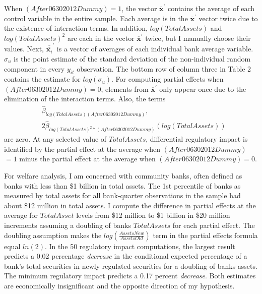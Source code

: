 \documentclass[preprint,12pt]{elsarticle}
\begin{document}
When $(After06302012Dummy)=1$, the vector $\overline{\bm{x}}^{'}$ contains the average of each control variable in the entire sample.  Each average is in the $\overline{\bm{x}}^{'}$ vector twice due to the existence of interaction terms.  In addition, $log(TotalAssets)$ and $log(TotalAssets)^{2}$ are each in the vector $\overline{\bm{x}}^{'}$ twice, but I manually choose their values.  Next, $\overline{\overline{\bm{x}_{i}}}^{'}$ is a vector of averages of each individual bank average variable.  $\hat{\sigma}_{u}$ is the point estimate of the standard deviation of the non-individual random component in every $y_{it}$ observation. The bottom row of column three in Table 2 contains the estimate for $log(\sigma_{u})$.   For computing partial effects when $(After06302012Dummy)=0$, elements from $\overline{\bm{x}}^{'}$ only appear once due to the elimination of the interaction terms.  Also, the terms
\begin{align*}
&\hat{\beta}_{log(TotalAssets)(After06302012Dummy)}, \\ &2\hat{\beta}_{log(TotalAssets)^{2}*(After06302012Dummy)}(log(TotalAssets))
\end{align*}
are zero. At any selected value of $TotalAssets$, differential regulatory impact is identified by the partial effect at the average when $(After06302012Dummy)$ $=1$ minus the partial effect at the average when $(After06302012Dummy)=0$.  %

For welfare analysis, I am concerned with community banks, often defined as banks with less than \$1 billion in total assets.  The 1st percentile of banks as measured by total assets for all bank-quarter observations in the sample had about \$12 million in total assets.  I compute the difference in partial effects at the average for $TotalAsset$ levels from \$12 million to \$1 billion in \$20 million increments assuming a doubling of banks $TotalAssets$ for each partial effect.  The doubling assumption makes the $log(\frac{AssetsNew}{AssetsOld})$ term in the partial effects formula equal $ln(2)$.  In the 50 regulatory impact computations, the largest result predicts a 0.02 percentage \textit{decrease} in the conditional expected percentage of a bank's total securities in newly regulated securities for a doubling of banks assets.  The minimum regulatory impact predicts a 0.17 percent \textit{decrease}.  Both estimates are economically insignificant and the opposite direction of my hypothesis. 
\end{document}
